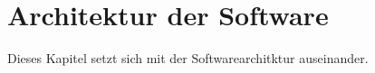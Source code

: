 \documentclass[12pt,a4paper,bibliography=totocnumbered,listof=totocnumbered]{article}
\begin{document}
%	

\pagebreak

\section{Architektur der Software}
Dieses Kapitel setzt sich mit der Softwarearchitktur auseinander. 
\end{document}
